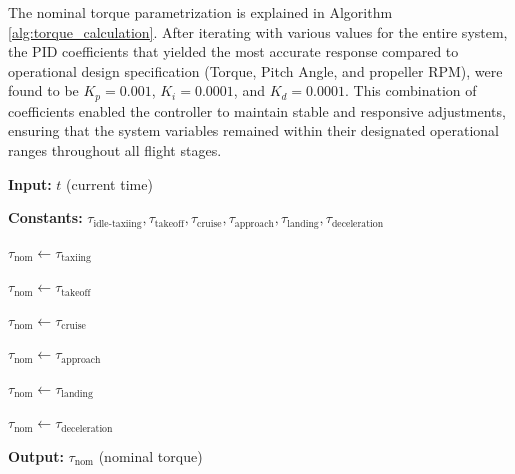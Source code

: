 \documentclass{Format}
\begin{document}
The nominal torque parametrization is explained in Algorithm \autoref{alg:torque_calculation}. After iterating with various values for the entire system, the PID coefficients that yielded the most accurate response compared to operational design specification (Torque, Pitch Angle, and propeller RPM), were found to be \( K_p=0.001 \), \( K_i=0.0001 \), and \( K_d=0.0001 \). This combination of coefficients enabled the controller to maintain stable and responsive adjustments, ensuring that the system variables remained within their designated operational ranges throughout all flight stages.





\begin{algorithm}
\caption{Nominal Torque Calculation During Flight Stages}\label{alg:torque_calculation}
\begin{algorithmic}[1]

\State \textbf{Input:} $t$ (current time)

\State \textbf{Constants:} $\tau_{\text{idle-taxiing}}, \tau_{\text{takeoff}}, \tau_{\text{cruise}}, \tau_{\text{approach}}, \tau_{\text{landing}}, \tau_{\text{deceleration}}$ 

    \State $\tau_{\text{nom}} \gets \tau_{\text{taxiing}}$ 
    
    \State $\tau_{\text{nom}} \gets \tau_{\text{takeoff}}$ 
    
    \State $\tau_{\text{nom}} \gets \tau_{\text{cruise}}$ 
    
    \State $\tau_{\text{nom}} \gets \tau_{\text{approach}}$ 
    
    \State $\tau_{\text{nom}} \gets \tau_{\text{landing}}$ 
    
\Else
    \State $\tau_{\text{nom}} \gets \tau_{\text{deceleration}}$ 
    
\EndIf
\State \textbf{Output:} $\tau_{\text{nom}}$ (nominal torque)
\end{algorithmic} 
\end{algorithm}
\end{document}
